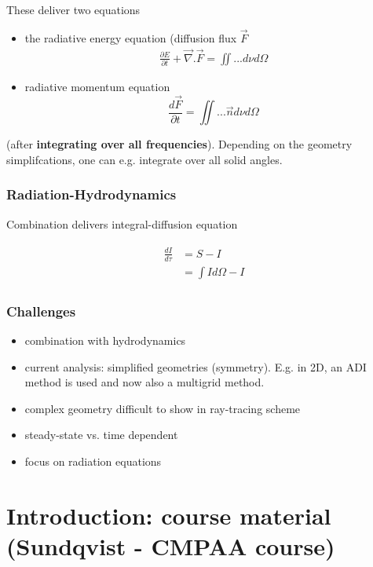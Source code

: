 \documentclass[../main/main.tex]{subfiles}
\begin{document}
These deliver two equations
\begin{itemize}
	\item the radiative energy equation (diffusion flux $\vec{F}$
	\begin{eqnarray}
	\frac{\partial E}{\partial t} + \vec{\nabla} . \vec{F} = \iint ... d\nu d \Omega
	\end{eqnarray}
	\item radiative momentum equation
	\begin{equation}
		\frac{d\vec{F}}{\partial t} = \iint ... \vec{n} d\nu d\Omega
		\end{equation}
\end{itemize}
(after \textbf{integrating over all frequencies}). Depending on the geometry simplifcations, one can e.g. integrate over all solid angles.


\subsubsection{Radiation-Hydrodynamics}
Combination delivers integral-diffusion equation

\begin{eqnarray}
\begin{aligned}
\frac{dI}{d\tau} &=  S - I \\
	&= \int I d\Omega - I
\end{aligned}
\end{eqnarray}

\subsubsection{Challenges}
\begin{itemize}
	\item combination with hydrodynamics
	\item current analysis: simplified geometries (symmetry). E.g. in 2D, an ADI method is used and now also a multigrid method. 
	\item complex geometry difficult to show in ray-tracing scheme
	\item steady-state vs. time dependent
	\item focus on radiation equations
\end{itemize}



\newpage
\section{Introduction: course material (Sundqvist - CMPAA course)}
\end{document}
